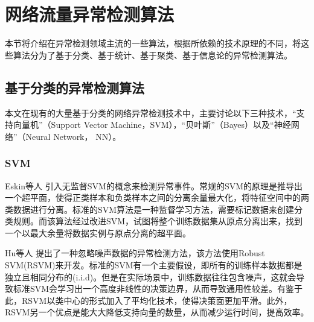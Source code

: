 \section{网络流量异常检测算法}


本节将介绍在异常检测领域主流的一些算法，根据所依赖的技术原理的不同，将这些算法分为了基于分类、基于统计、基于聚类、基于信息论的异常检测算法。

\subsection{基于分类的异常检测算法}



本文在现有的大量基于分类的网络异常检测技术中，主要讨论以下三种技术，“支持向量机”（Support Vector Machine，SVM），“贝叶斯”（Bayes）以及“神经网络”（Neural Network， NN）。

\subsubsection{SVM}
Eskin等人\cite{2002AEskin} 引入无监督SVM的概念来检测异常事件。常规的SVM的原理是推导出一个超平面，使得正类样本和负类样本之间的分离余量最大化，将特征空间中的两类数据进行分离。标准的SVM算法是一种监督学习方法，需要标记数据来创建分类规则。而该算法经过改进SVM，试图将整个训练数据集从原点分离出来，找到一个以最大余量将数据实例与原点分离的超平面。

Hu等人\cite{Hu2003Robust} 提出了一种忽略噪声数据的异常检测方法，该方法使用Robust SVM(RSVM)来开发。标准的SVM有一个主要假设，即所有的训练样本数据都是独立且相同分布的(i.i.d)。但是在实际场景中，训练数据往往包含噪声，这就会导致标准SVM会学习出一个高度非线性的决策边界，从而导致通用性较差。有鉴于此，RSVM以类中心的形式加入了平均化技术，使得决策面更加平滑。此外，RSVM另一个优点是能大大降低支持向量的数量，从而减少运行时间，提高效率。

